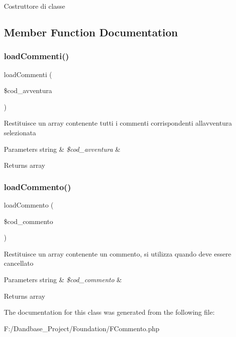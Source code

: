 Costruttore di classe 

\subsection{Member Function Documentation}
\mbox{\label{class_f_commento_a65cb773599364a81de198c9b419eba69}} 
\subsubsection{\texorpdfstring{load\+Commenti()}{loadCommenti()}}
{\footnotesize\ttfamily load\+Commenti (\begin{DoxyParamCaption}\item[{}]{\$cod\+\_\+avventura }\end{DoxyParamCaption})}

Restituisce un array contenente tutti i commenti corrispondenti all\textquotesingle{}avventura selezionata


\begin{DoxyParams}[1]{Parameters}
string & {\em \$cod\+\_\+avventura} & \\
\hline
\end{DoxyParams}
\begin{DoxyReturn}{Returns}
array 
\end{DoxyReturn}
\mbox{\label{class_f_commento_aad304f1e51e8522f6b69b74bffc35aec}} 
\subsubsection{\texorpdfstring{load\+Commento()}{loadCommento()}}
{\footnotesize\ttfamily load\+Commento (\begin{DoxyParamCaption}\item[{}]{\$cod\+\_\+commento }\end{DoxyParamCaption})}

Restituisce un array contenente un commento, si utilizza quando deve essere cancellato


\begin{DoxyParams}[1]{Parameters}
string & {\em \$cod\+\_\+commento} & \\
\hline
\end{DoxyParams}
\begin{DoxyReturn}{Returns}
array 
\end{DoxyReturn}


The documentation for this class was generated from the following file\+:\begin{DoxyCompactItemize}
\item 
F\+:/\+Dandbase\+\_\+\+Project/\+Foundation/F\+Commento.\+php\end{DoxyCompactItemize}

